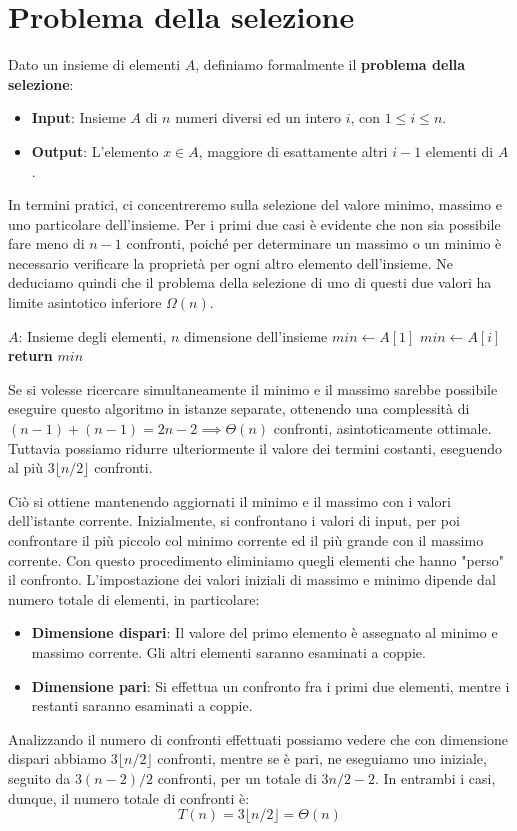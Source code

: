 \section{Problema della selezione}
Dato un insieme di elementi $A$, definiamo formalmente il \textbf{problema della selezione}: \begin{itemize}
	\item \textbf{Input}: Insieme $A$ di $n$ numeri diversi ed un intero $i$, con $1 \leq i \leq n$.
	\item \textbf{Output}: L'elemento $x\in A$, maggiore di esattamente altri $i-1$ elementi di $A$.
\end{itemize}
\noindent In termini pratici, ci concentreremo sulla selezione del valore minimo, massimo e uno particolare dell'insieme. Per i primi due casi è
evidente che non sia possibile fare meno di $n-1$ confronti, poiché per determinare un massimo o un minimo è necessario verificare la proprietà per
ogni altro elemento dell'insieme. Ne deduciamo quindi che il problema della selezione di uno di questi due valori ha limite asintotico inferiore
$\Omega(n)$.
\begin{algorithm}[h]
	\caption{findMin(A, n)}
	\begin{algorithmic}[i]
		\Require $A$: Insieme degli elementi, $n$ dimensione dell'insieme
		\State $min\gets A[1]$
		\State $min\gets A[i]$
		\EndIf
		\EndFor
		\State \textbf{return} $min$
	\end{algorithmic}
\end{algorithm}

\noindent Se si volesse ricercare simultaneamente il minimo e il massimo sarebbe possibile eseguire questo algoritmo in istanze separate, ottenendo una
complessità di $(n-1)+(n-1) = 2n-2\implies \Theta(n)$ confronti, asintoticamente ottimale. Tuttavia possiamo ridurre ulteriormente il valore dei termini
costanti, eseguendo al più $3\lfloor n/2\rfloor$ confronti.\par
Ciò si ottiene mantenendo aggiornati il minimo e il massimo con i valori dell'istante corrente. Inizialmente, si confrontano i valori di input, per poi
confrontare il più piccolo col minimo corrente ed il più grande con il massimo corrente. Con questo procedimento eliminiamo quegli elementi che hanno
"perso" il confronto. L'impostazione dei valori iniziali di massimo e minimo dipende dal numero totale di elementi, in particolare: \begin{itemize}
	\item \textbf{Dimensione dispari}: Il valore del primo elemento è assegnato al minimo e massimo corrente. Gli altri elementi saranno esaminati a
	coppie.
	\item \textbf{Dimensione pari}: Si effettua un confronto fra i primi due elementi, mentre i restanti saranno esaminati a coppie.
\end{itemize}
\noindent Analizzando il numero di confronti effettuati possiamo vedere che con dimensione dispari abbiamo $3\lfloor n/2\rfloor$ confronti, mentre se è
pari, ne eseguiamo uno iniziale, seguito da $3(n-2)/2$ confronti, per un totale di $3n/2-2$. In entrambi i casi, dunque, il numero totale di confronti
è: \[
	T(n) = 3\lfloor n/2\rfloor = \Theta(n)
\]

